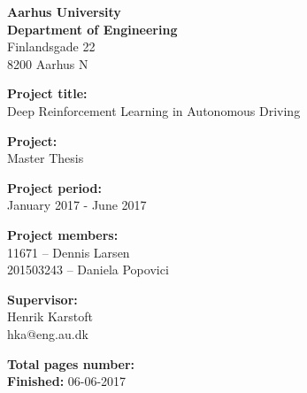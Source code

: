 \begin{minipage}[t]{1\textwidth}

{\small 
\flushleft
\textbf{Aarhus University}\\
\textbf{Department of Engineering}  \\
Finlandsgade 22 \\
8200 Aarhus N \\
}

\vspace*{1cm}

\textbf{Project title:} \\[5pt]\bigskip\hspace{2ex}
Deep Reinforcement Learning in Autonomous Driving

\textbf{Project:} \\[5pt]\bigskip\hspace{2ex}
Master Thesis

\textbf{Project period:} \\[5pt]\bigskip\hspace{2ex}
January 2017 - June 2017

\textbf{Project members:} \\[5pt]\hspace*{2ex}
11671 	  -- Dennis Larsen \\\hspace*{2ex}
201503243 -- Daniela Popovici \\\hspace*{2ex}

\textbf{Supervisor:} \\[5pt]\hspace*{2ex}
Henrik Karstoft \\\hspace*{2ex}
hka@eng.au.dk \\\hspace*{2ex}

\textbf{Total pages number:} \pageref{LastPage} \\
\textbf{Finished:} 06-06-2017
\hfill
\vfill
\end{minipage}

